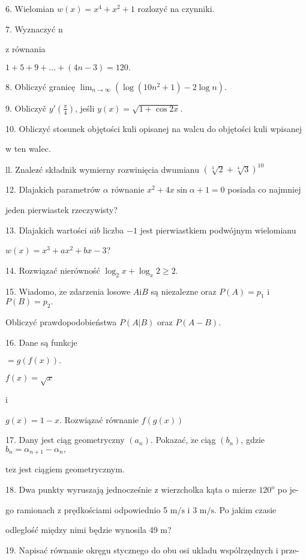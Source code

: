 \documentclass[a4paper,12pt]{article}
\begin{document}
6. Wielomian $w(x)=x^{4}+x^{2}+1$ rozlozyć na czynniki.

7. Wyznaczyć n

z równania

$1+5+9+\ldots+(4n-3)=120.$

8. Obliczyć granicę $\displaystyle \lim_{n\rightarrow\infty}(\log(10n^{2}+1)-2\log n).$

9. Obliczyč $y'(\displaystyle \frac{\pi}{4})$, jeśli $y(x)=\sqrt{1+\cos 2x}.$

10. Obliczyć stosunek objętości kuli opisanej na walcu do objętości kuli wpisanej

w ten walec.

ll. Znalez$\acute{}$ć składnik wymierny rozwinięcia dwumianu $(\sqrt[3]{2}+\sqrt[4]{3})^{10}$

12. Dlajakich parametrów $\alpha$ równanie $x^{2}+4x\sin\alpha+1=0$ posiada co najmniej

jeden pierwiastek rzeczywisty?

13. Dlajakich wartości $a\mathrm{i}b$ liczba $-1$ jest pierwiastkiem podwójnym wielomianu

$w(x)=x^{3}+ax^{2}+bx-3$?

14. Rozwiązać nierówność $\log_{2}x+\log_{x}2\geq 2.$

15. Wiadomo, $\dot{\mathrm{z}}\mathrm{e}$ zdarzenia losowe $A\mathrm{i}B$ są niezalezne oraz $P(A)=p_{1}$ i $P(B)= p_{2}.$

Obliczyć prawdopodobieństwa $P(A|B)$ oraz $P(A-B).$




16. Dane są funkcje

$= g(f(x)).$

$f(x)=\sqrt{x}$

i

$g(x)=1-x$. Rozwiązać równanie $f(g(x))$

17. Dany jest ciąg geometryczny $(a_{n})$. Pokazać, $\dot{\mathrm{z}}\mathrm{e}$ ciąg $(b_{n})$, gdzie $b_{n}=\alpha_{n+1}-\alpha_{n},$

$\mathrm{t}\mathrm{e}\dot{\mathrm{z}}$ jest ciągiem geometrycznym.

18. Dwa punkty wyruszają jednocześnie z wierzcholka kąta o mierze $120^{\mathrm{o}}$ po je-

go ramionach z prędkościami odpowiednio 5 $\mathrm{m}/\mathrm{s}$ i 3 $\mathrm{m}/\mathrm{s}$. Po jakim czasie

odleglość między nimi będzie wynosila 49 $\mathrm{m}$?

19. Napisać równanie okręgu stycznego do obu osi ukladu wspólrzędnych i prze-
\end{document}
